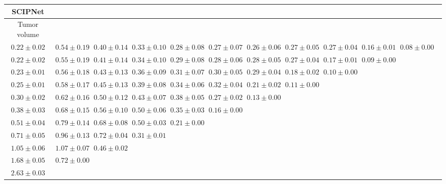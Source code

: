 \begin{table}[ht]
{{\begin{adjustbox}{width=\textwidth}
\begin{tabular}{cccccccccccc}
\hline
SCIPNet &  &  &  &  &  &  &  &  &  & \\
\hline
Tumor volume &  &  &  &  &  &  &  &  &  & \\
\hline
$0.22 \pm 0.02$ & $0.54 \pm 0.19$ & $0.40 \pm 0.14$ & $0.33 \pm 0.10$ & $0.28 \pm 0.08$ & $0.27 \pm 0.07$ & $0.26 \pm 0.06$ & $0.27 \pm 0.05$ & $0.27 \pm 0.04$ & $0.16 \pm 0.01$ & $0.08 \pm 0.00$ &  \\
$0.22 \pm 0.02$ & $0.55 \pm 0.19$ & $0.41 \pm 0.14$ & $0.34 \pm 0.10$ & $0.29 \pm 0.08$ & $0.28 \pm 0.06$ & $0.28 \pm 0.05$ & $0.27 \pm 0.04$ & $0.17 \pm 0.01$ & $0.09 \pm 0.00$ &  &  \\
$0.23 \pm 0.01$ & $0.56 \pm 0.18$ & $0.43 \pm 0.13$ & $0.36 \pm 0.09$ & $0.31 \pm 0.07$ & $0.30 \pm 0.05$ & $0.29 \pm 0.04$ & $0.18 \pm 0.02$ & $0.10 \pm 0.00$ &  &  &  \\
$0.25 \pm 0.01$ & $0.58 \pm 0.17$ & $0.45 \pm 0.13$ & $0.39 \pm 0.08$ & $0.34 \pm 0.06$ & $0.32 \pm 0.04$ & $0.21 \pm 0.02$ & $0.11 \pm 0.00$ &  &  &  &  \\
$0.30 \pm 0.02$ & $0.62 \pm 0.16$ & $0.50 \pm 0.12$ & $0.43 \pm 0.07$ & $0.38 \pm 0.05$ & $0.27 \pm 0.02$ & $0.13 \pm 0.00$ &  &  &  &  &  \\
$0.38 \pm 0.03$ & $0.68 \pm 0.15$ & $0.56 \pm 0.10$ & $0.50 \pm 0.06$ & $0.35 \pm 0.03$ & $0.16 \pm 0.00$ &  &  &  &  &  &  \\
$0.51 \pm 0.04$ & $0.79 \pm 0.14$ & $0.68 \pm 0.08$ & $0.50 \pm 0.03$ & $0.21 \pm 0.00$ &  &  &  &  &  &  &  \\
$0.71 \pm 0.05$ & $0.96 \pm 0.13$ & $0.72 \pm 0.04$ & $0.31 \pm 0.01$ &  &  &  &  &  &  &  &  \\
$1.05 \pm 0.06$ & $1.07 \pm 0.07$ & $0.46 \pm 0.02$ &  &  &  &  &  &  &  &  &  \\
$1.68 \pm 0.05$ & $0.72 \pm 0.00$ &  &  &  &  &  &  &  &  &  &  \\
$2.63 \pm 0.03$ &  &  &  &  &  &  &  &  &  &  &  \\

\end{tabular}
\end{adjustbox}

}
}

\end{table}

